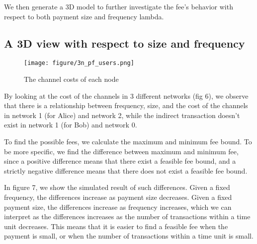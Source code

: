 \documentclass[twocolumn,10pt]{report}
\begin{document}
We then generate a 3D model to further investigate the fee's behavior with respect to both payment size and frequency lambda. 


\subsection{A 3D view with respect to size and frequency }
\begin{figure}[t]
    \begin{center}
    \setlength{\unitlength}{0.012500in}%
    \texttt{[image: figure/3n\_pf\_users.png]}
    \end{center}
    \caption{The channel costs of each node}
    \label{figure_3Node6} 
\end{figure}

By looking at the cost of the channels in 3 different networks (fig 6), we observe that there is a relationship between frequency, size, and the cost of the channels in network 1 (for Alice) and network 2, while the indirect transaction doesn't exist in network 1 (for Bob) and network 0. 

To find the possible fees, we calculate the maximum and minimum fee bound. To be more specific, we find the difference between maximum and minimum fee, since a positive difference means that there exist a feasible fee bound, and a strictly negative difference means that there does not exist a feasible fee bound. 

In figure 7, we show the simulated result of such differences. Given a fixed frequency, the differences increase as payment size decreases. Given a fixed payment size, the differences increase as frequency increases, which we can interpret as the differences increases as the number of transactions within a time unit decreases. This means that it is easier to find a feasible fee when the payment is small, or when the number of transactions within a time unit is small. 
\end{document}
